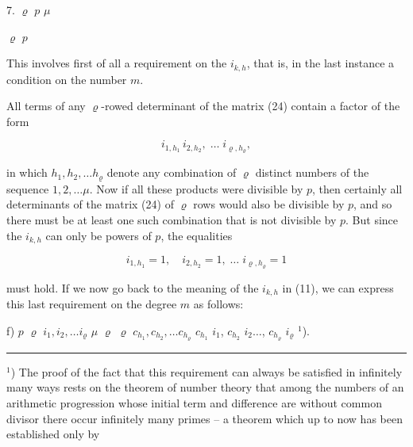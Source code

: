 
7.  $\varrho$  $p$
 $\mu$


 $\varrho$  $p$

This involves first of all a requirement on the $i_{k,h}$, that is,
in the last instance a condition on the number $m$.

All terms of any $\varrho$-rowed determinant of the matrix (24)
contain a factor of the form

\[
i_{1,h_1}\,i_{2,h_2}, \; \dots \; i_{\varrho,h_\varrho},
\]

in which $h_1, h_2, \dots h_\varrho$ denote any combination of $\varrho$
distinct numbers of the sequence $1, 2, \dots \mu$. Now if all
these products were divisible by $p$, then certainly all determinants of the
matrix (24) of $\varrho$ rows would also be divisible by $p$, and so there
must be at least one such combination that is not divisible by $p$.
But since the $i_{k,h}$ can only be powers of $p$, the equalities

\[
i_{1,h_1} = 1, \quad i_{2,h_2} = 1, \; \dots \; i_{\varrho,h_\varrho} = 1
\]

must hold. If we now go back to the meaning of the $i_{k,h}$ in (11), we
can express this last requirement on the degree $m$ as
follows:

f)  $p$  $\varrho$
 $i_1, i_2, \dots i_\varrho$
$\mu$ 
$\varrho$ $\varrho$  $c_{h_1}, c_{h_2}, \dots c_{h_\varrho}$  $c_{h_1}$  $i_1$, $c_{h_2}$
 $i_2 \dots$, $c_{h_\varrho}$  $i_\varrho$ $^1$).

\noindent\rule{4cm}{0.4pt}

\footnotesize
$^1$) The proof of the fact that this requirement can always be
satisfied in infinitely many ways rests on the theorem
of number theory that among the numbers of an arithmetic progression
whose initial term and difference are without common divisor there occur
infinitely many primes -- a theorem which up to now has been established only by
\normalsize
